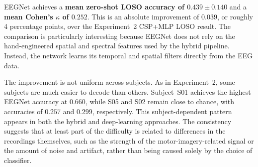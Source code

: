 \documentclass[11pt,a4paper]{article}
\begin{document}
\begin{table}[H]
	\centering
	\caption{Experiment 3 -- EEGNet LOSO test results per held-out subject, including subsequent
		subject-specific fine-tuning results (Section~\ref{sec:results-exp3-ft}).}
	\label{tab:exp3-loso}
\end{table}

EEGNet achieves a \textbf{mean zero-shot LOSO accuracy of $0.439 \pm 0.140$} and a
\textbf{mean Cohen's $\kappa$ of $0.252$}. This is an absolute improvement of $0.039$, or
roughly 4 percentage points, over the Experiment~2 CSP+MLP LOSO result. The comparison is
particularly interesting because EEGNet does not rely on the hand-engineered spatial and
spectral features used by the hybrid pipeline. Instead, the network learns its temporal and
spatial filters directly from the EEG data.

The improvement is not uniform across subjects. As in Experiment~2, some subjects are much easier
to decode than others. Subject~S01 achieves the highest EEGNet accuracy at $0.660$, while S05
and S02 remain close to chance, with accuracies of $0.257$ and $0.299$, respectively. This
subject-dependent pattern appears in both the hybrid and deep-learning approaches. The consistency
suggests that at least part of the difficulty is related to differences in the recordings
themselves, such as the strength of the motor-imagery-related signal or the amount of noise and
artifact, rather than being caused solely by the choice of classifier.
\end{document}
